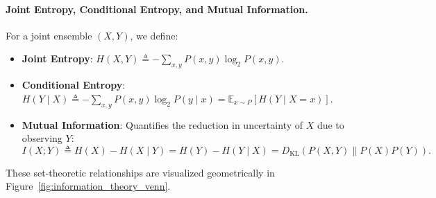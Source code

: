 \paragraph{Joint Entropy, Conditional Entropy, and Mutual Information.}
For a joint ensemble $(X, Y)$, we define:
\begin{itemize}[noitemsep]
  \item \textbf{Joint Entropy}: $H(X, Y) \triangleq -\sum_{x, y} P(x, y) \log_2 P(x, y)$.
  \item \textbf{Conditional Entropy}: $H(Y \mid X) \triangleq -\sum_{x, y} P(x, y) \log_2 P(y \mid x) = \mathbb{E}_{x \sim P}[H(Y \mid X = x)]$.
  \item \textbf{Mutual Information}: Quantifies the reduction in uncertainty of $X$ due to observing $Y$:
  \begin{equation}
  I(X; Y) \triangleq H(X) - H(X \mid Y) = H(Y) - H(Y \mid X) = D_{\text{KL}}(P(X, Y) \parallel P(X)P(Y)).
  \label{eq:mutual_information_def}
  \end{equation}
\end{itemize}
These set-theoretic relationships are visualized geometrically in Figure~\ref{fig:information_theory_venn}.

